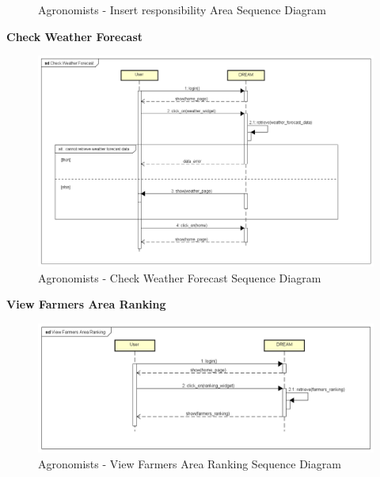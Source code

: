 \documentclass[table, 12pt]{article}
\begin{document}
\begin{itemize}
\begin{center}
\begin{figure}[H]
                    \caption{Agronomists - Insert responsibility Area Sequence Diagram}
                    \label{fig: sdAgronomist_insertResponsibilityArea}
                \end{figure}
            \end{center}
            \newpage
            \textbf{Check Weather Forecast}\\
            \begin{center}
                \begin{figure}[H]
                    \includegraphics[scale=0.55, center]{assets/Sequence diagrams/Agronomist/Check Weather Forecast.png}
                    \caption{Agronomists - Check Weather Forecast Sequence Diagram}
                    \label{fig: sdAgronomist_checkWeatherForecast}
                \end{figure}
            \end{center}
            \newpage
            \textbf{View Farmers Area Ranking}\\
            \begin{center}
                \begin{figure}[H]
                    \includegraphics[scale=0.60, center]{assets/Sequence diagrams/Agronomist/View Farmers Area Ranking.png}
                    \caption{Agronomists - View Farmers Area Ranking Sequence Diagram}
                    \label{fig: sdAgronomist_viewFarmersAreaRanking}
                \end{figure}
            \end{center}
        \end{itemize}
        \newpage
\end{document}
